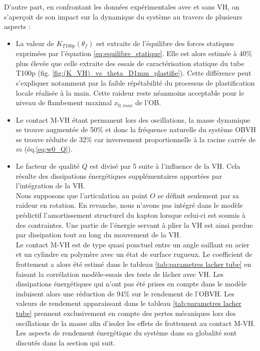 D'autre part, en confrontant les données expérimentales avec et sans VH, on s'aperçoit de son impact sur la dynamique du système au travers de plusieurs aspects :
\begin{itemize}[label=$\bullet$]
	\item La valeur de $K_{T100p}(\theta_f)$ est extraite de l'équilibre des forces statiques exprimées par l'équation \ref{eq:equilibre_statique}. Elle est alors estimée à 40\% plus élevée que celle extraite des essais de caractérisation statique du tube T100p (fig. \ref{fig:(K_VH)_vs_theta_D1mm_plastifie}). Cette différence peut s'expliquer notamment par la faible répétabilité du processus de plastification locale réalisée à la main. Cette raideur reste néanmoins acceptable pour le niveau de flambement maximal $x_{0,max}$ de l'OB.
	\item Le contact M-VH étant permanent lors des oscillations, la masse dynamique se trouve augmentée de 50\% et donc la fréquence naturelle du système  OBVH se trouve réduite de 32\% car inversement proportionnelle à la racine carrée de $m$ (éq.\ref{eq:w0_Q}).
	\item Le facteur de qualité $Q$ est divisé par 5 suite à l'influence de la VH. Cela résulte des dissipations énergétiques supplémentaires apportées par l'intégration de la VH.\\
	Nous supposons que l'articulation au point $O$ se définit seulement par sa raideur en rotation. En revanche, nous n'avons pas intégré dans le modèle prédictif l'amortissement structurel du kapton lorsque celui-ci est soumis à des contraintes. Une partie de l'énergie servant à plier la VH est ainsi perdue par dissipation tout au long du mouvement de la VH.\\
	Le contact M-VH est de type quasi ponctuel entre un angle saillant en acier et un cylindre en polymère avec un état de surface rugueux. Le coefficient de frottement a alors été estimé dans le tableau \ref{tab:parametres lacher tube} en faisant la corrélation modèle-essais des tests de lâcher avec VH. Les dissipations énergétiques qui n'ont pas été prises en compte dans le modèle induisent alors une réduction de 94\% sur le rendement de l'OBVH. Les valeurs de rendement apparaissant dans le tableau \ref{tab:parametres lacher tube} prennent exclusivement en compte des pertes mécaniques lors des oscillations de la masse afin d'isoler les effets de frottement au contact M-VH. Les aspects de rendement énergétique du système dans sa globalité sont discutés dans la section qui suit.
\end{itemize} 	 
